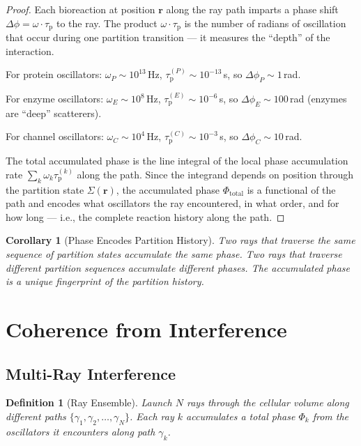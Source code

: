 \documentclass[11pt,twocolumn,a4paper]{article}
\newtheorem{corollary}[theorem]{Corollary}
\newtheorem{definition}[theorem]{Definition}
\newcommand{\taup}{\tau_{\mathrm{p}}}
\begin{document}
\begin{proof}
Each bioreaction at position $\mathbf{r}$ along the ray path imparts
a phase shift $\Delta\phi = \omega \cdot \taup$ to the ray. The
product $\omega \cdot \taup$ is the number of radians of oscillation
that occur during one partition transition --- it measures the
``depth'' of the interaction.

For protein oscillators: $\omega_P \sim 10^{13}$\,Hz, $\taup^{(P)}
\sim 10^{-13}$\,s, so $\Delta\phi_P \sim 1$\,rad.

For enzyme oscillators: $\omega_E \sim 10^{8}$\,Hz, $\taup^{(E)}
\sim 10^{-6}$\,s, so $\Delta\phi_E \sim 100$\,rad (enzymes are
``deep'' scatterers).

For channel oscillators: $\omega_C \sim 10^{4}$\,Hz, $\taup^{(C)}
\sim 10^{-3}$\,s, so $\Delta\phi_C \sim 10$\,rad.

The total accumulated phase is the line integral of the local phase
accumulation rate $\sum_k \omega_k \taup^{(k)}$ along the path. Since
the integrand depends on position through the partition state
$\Sigma(\mathbf{r})$, the accumulated phase $\Phi_{\mathrm{total}}$ is
a functional of the path and encodes what oscillators the ray
encountered, in what order, and for how long --- i.e., the complete
reaction history along the path.
\end{proof}

\begin{corollary}[Phase Encodes Partition History]
\label{cor:phase-history}
Two rays that traverse the same sequence of partition states
accumulate the same phase. Two rays that traverse different partition
sequences accumulate different phases. The accumulated phase is a
unique fingerprint of the partition history.
\end{corollary}


\section{Coherence from Interference}
\label{sec:coherence}

\subsection{Multi-Ray Interference}

\begin{definition}[Ray Ensemble]
\label{def:ray-ensemble}
Launch $N$ rays through the cellular volume along different paths
$\{\gamma_1, \gamma_2, \ldots, \gamma_N\}$. Each ray $k$ accumulates
a total phase $\Phi_k$ from the oscillators it encounters along path
$\gamma_k$.
\end{definition}
\end{document}
